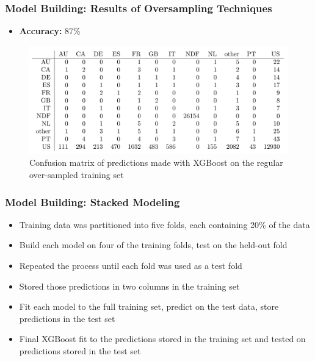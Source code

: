 \documentclass{beamer}
\begin{document}
\begin{frame}
\frametitle{Model Building: Results of Oversampling Techniques}
\begin{itemize}
  \item \textbf{Accuracy:} 87\%
\end{itemize}
\begin{figure}
\includegraphics[width=1\linewidth]{confusion_matrix.png}
\caption{Confusion matrix of predictions made with XGBoost on the regular over-sampled training set}
\end{figure}
\end{frame}


\begin{frame}
\frametitle{Model Building: Stacked Modeling}
\begin{itemize}
  \item Training data was partitioned into five folds, each containing 20\% of the data
  \item Build each model on four of the training folds, test on the held-out fold
  \item Repeated the process until each fold was used as a test fold
  \item Stored those predictions in two columns in the training set
  \item Fit each model to the full training set, predict on the test data, store predictions in the test set
  \item Final XGBoost fit to the predictions stored in the training set and tested on predictions stored in the test set 
\end{itemize}
\end{frame}
\end{document}
